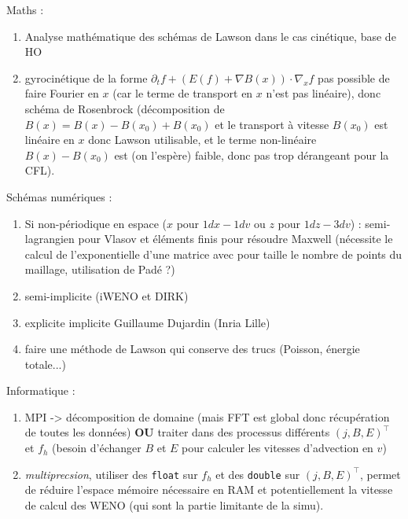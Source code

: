 Maths :
\begin{enumerate}
  \item Analyse mathématique des schémas de Lawson dans le cas cinétique, base de HO
  \item gyrocinétique de la forme $\partial_t f + (E(f)+\nabla B(x))\cdot\nabla_xf$ pas possible de faire Fourier en $x$ (car le terme de transport en $x$ n'est pas linéaire), donc schéma de Rosenbrock (décomposition de $B(x)=B(x)-B(x_0)+B(x_0)$ et le transport à vitesse $B(x_0)$ est linéaire en $x$ donc Lawson utilisable, et le terme non-linéaire $B(x)-B(x_0)$ est (on l'espère) faible, donc pas trop dérangeant pour la CFL).
\end{enumerate}
Schémas numériques :
\begin{enumerate}
  \item Si non-périodique en espace ($x$ pour $1dx-1dv$ ou $z$ pour $1dz-3dv$) : semi-lagrangien pour Vlasov et éléments finis pour résoudre Maxwell (nécessite le calcul de l'exponentielle d'une matrice avec pour taille le nombre de points du maillage, utilisation de Padé ?)
  \item semi-implicite (iWENO et DIRK)
  \item explicite implicite Guillaume Dujardin (Inria Lille)
  \item faire une méthode de Lawson qui conserve des trucs (Poisson, énergie totale...)
\end{enumerate}
Informatique :
\begin{enumerate}
  \item MPI -> décomposition de domaine (mais FFT est global donc récupération de toutes les données) \textbf{OU} traiter dans des processus différents $(j,B,E)^\top$ et $f_h$ (besoin d'échanger $B$ et $E$ pour calculer les vitesses d'advection en $v$)
  \item \emph{multiprecsion}, utiliser des \texttt{float} sur $f_h$ et des \texttt{double} sur $(j,B,E)^\top$, permet de réduire l'espace mémoire nécessaire en RAM et potentiellement la vitesse de calcul des WENO (qui sont la partie limitante de la simu).
\end{enumerate}

